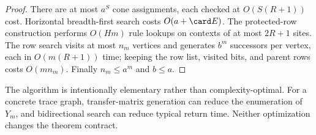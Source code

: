 \begin{proof}
There are at most $a^S$ cone assignments, each checked at $O(S(R+1))$ cost.  Horizontal breadth-first search costs $O(a+\card E)$.  The protected-row construction performs $O(Hm)$ rule lookups on contexts of at most $2R+1$ sites.  The row search visits at most $n_m$ vertices and generates $b^m$ successors per vertex, each in $O(m(R+1))$ time; keeping the row list, visited bits, and parent rows costs $O(mn_m)$.  Finally $n_m\leq a^m$ and $b\leq a$.
\end{proof}

The algorithm is intentionally elementary rather than complexity-optimal.  For a concrete trace graph, transfer-matrix generation can reduce the enumeration of $Y_m$, and bidirectional search can reduce typical return time.  Neither optimization changes the theorem contract.
